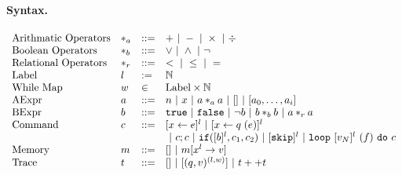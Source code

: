 \documentclass[a4paper,11pt]{article}
\begin{document}
\paragraph{Syntax.}
\[
\begin{array}{llll}
 \mbox{Arithmatic Operators} & *_a & ::= & + ~|~ - ~|~ \times 
%
~|~ \div \\  
  \mbox{Boolean Operators} & *_b & ::= & \lor ~|~ \land ~|~ \neg\\
   \mbox{Relational Operators} & *_r & ::= & < ~|~ \leq ~|~ = \\  
 \mbox{Label} & l & := & \mathbb{N} \\ 
 \mbox{While Map} & w & \in & \mbox{Label} \times \mathbb{N} \\
\mbox{AExpr} & \aexpr & ::= & 
	n ~|~ x ~|~ \aexpr *_a \aexpr ~|~ {[] ~|~ [\aexpr_0, \dots, \aexpr_i]  } \\
\mbox{BExpr} & \bexpr & ::= & 
	\etrue ~|~ \efalse  ~|~ \neg \bexpr
	 ~|~ \bexpr *_b \bexpr
	~|~ \aexpr *_r \aexpr \\
\mbox{Command} & c & ::= &   [\assign x \expr]^{l} ~|~  [\assign x q(\expr)]^{l}
%
 \\
& & & ~|~  c ; c ~|~ \eif([\bexpr]^{l}, c_1, c_2) 
	 ~|~ [\eskip]^{l} \sep {\eloop ~ [\valr_N]^{l} ~ (f) ~ \edo ~ c }
	\\
\mbox{Memory} & m & ::= & [] ~|~ m[x^{l} \to v] \\
%
\mbox{Trace} & t & ::= & [] ~|~ [(q, v)^{(l, w) }] ~|~ t ++ t
\end{array}
\]
%
%
\end{document}
